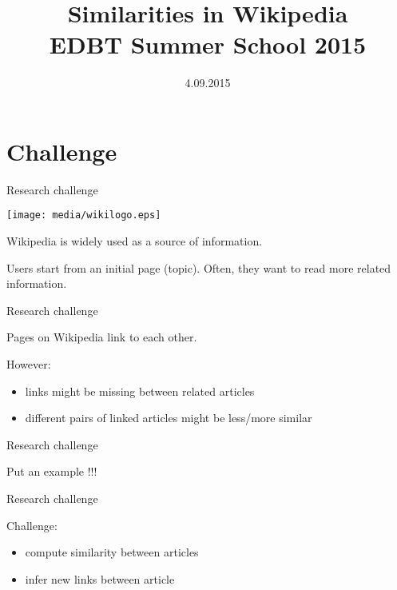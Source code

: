 \documentclass[xcolor=dvipsnames]{beamer}
\begin{document}
\begin{frame}
\title[Challenge 4]{Similarities in Wikipedia \\ EDBT Summer School 2015}
\author[]{}
\date{4.09.2015}
\maketitle
\end{frame}





\section{Challenge}

\begin{frame}{Research challenge}
 
\begin{center}
\texttt{[image: media/wikilogo.eps]}
\end{center}

Wikipedia is widely used as a source of information. 

Users start from an initial page (topic). Often, they want to read more related information.

\end{frame}

\begin{frame}{Research challenge}

Pages on Wikipedia link to each other.


However:

\begin{itemize}
\item links might be missing between related articles
\item different pairs of linked articles might be less/more similar
\end{itemize}

\end{frame}


\begin{frame}{Research challenge}

Put an example !!!

\end{frame}

\begin{frame}{Research challenge}


Challenge:

\begin{itemize}
\item compute similarity between articles
\item infer new links between article
\end{itemize}

\end{frame}
\end{document}
